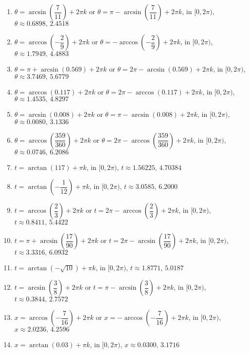 \begin{enumerate}

\setcounter{enumi}{\value{HW}}

\item $\theta = \arcsin\left(\dfrac{7}{11}\right) + 2\pi k$ or $\theta = \pi - \arcsin\left(\dfrac{7}{11}\right) + 2\pi k$, in  $[0, 2\pi)$, $\theta \approx 0.6898, \, 2.4518$
\item $\theta = \arccos\left(-\dfrac{2}{9}\right) + 2\pi k$ or $\theta = - \arccos\left(-\dfrac{2}{9}\right) + 2\pi k$, in  $[0, 2\pi)$, $\theta \approx 1.7949, \, 4.4883$
\item $\theta = \pi + \arcsin(0.569) + 2\pi k$ or $\theta = 2\pi - \arcsin(0.569) + 2\pi k$, in  $[0, 2\pi)$, $\theta \approx 3.7469, \, 5.6779$
\item $\theta= \arccos(0.117) + 2\pi k$ or $\theta = 2\pi - \arccos(0.117) + 2\pi k$, in  $[0, 2\pi)$, $\theta \approx 1.4535, \, 4.8297$
\item $\theta = \arcsin(0.008) + 2\pi k$ or $\theta = \pi - \arcsin(0.008) + 2\pi k$, in  $[0, 2\pi)$, $\theta \approx 0.0080, \, 3.1336$
\item $\theta = \arccos\left(\dfrac{359}{360}\right) + 2\pi k$ or $\theta = 2\pi - \arccos\left(\dfrac{359}{360}\right) + 2\pi k$, in  $[0, 2\pi)$, $\theta \approx 0.0746, \, 6.2086$
\item $t = \arctan(117) + \pi k$, in  $[0, 2\pi)$, $t \approx 1.56225, \, 4.70384$
\item $t = \arctan\left(-\dfrac{1}{12}\right) + \pi k$, in  $[0, 2\pi)$,  $t \approx 3.0585, \, 6.2000$
\item $t = \arccos\left(\dfrac{2}{3}\right) + 2\pi k$ or $t = 2\pi - \arccos\left(\dfrac{2}{3}\right) + 2\pi k$, in  $[0, 2\pi)$, $t \approx 0.8411, \, 5.4422$
\item $t = \pi + \arcsin\left(\dfrac{17}{90}\right) + 2\pi k$ or $t = 2\pi - \arcsin\left(\dfrac{17}{90}\right) + 2\pi k$, in  $[0, 2\pi)$, $t \approx 3.3316, \, 6.0932$
\item $t = \arctan\left(-\sqrt{10}\right) + \pi k$, in  $[0, 2\pi)$, $t \approx 1.8771, \, 5.0187$
\item $t = \arcsin\left(\dfrac{3}{8}\right) + 2\pi k$ or $t = \pi - \arcsin\left(\dfrac{3}{8}\right) + 2\pi k$, in  $[0, 2\pi)$, $t \approx 0.3844, \, 2.7572$
\item $x =  \arccos\left(-\dfrac{7}{16}\right) + 2\pi k$ or $x = - \arccos\left(-\dfrac{7}{16}\right) + 2\pi k$, in  $[0, 2\pi)$, $x \approx 2.0236, \, 4.2596$
\item $x = \arctan(0.03) + \pi k$, in  $[0, 2\pi)$, $x \approx 0.0300, \, 3.1716$


\end{enumerate}
